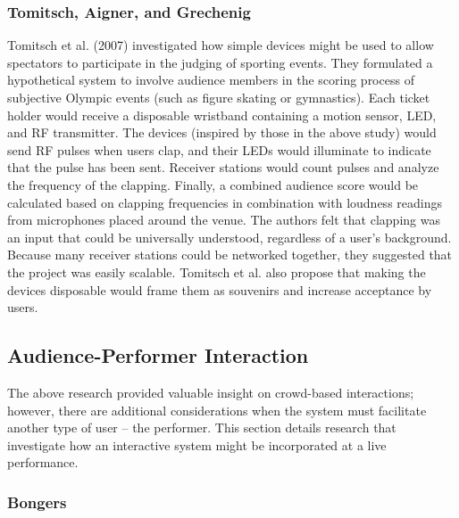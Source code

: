 \subsubsection{Tomitsch, Aigner, and Grechenig}

Tomitsch et al. (2007) investigated how simple devices might be used to allow spectators to participate in the judging of sporting events. They formulated a hypothetical system to involve audience members in the scoring process of subjective Olympic events (such as figure skating or gymnastics). Each ticket holder would receive a disposable wristband containing a motion sensor, LED, and RF transmitter. The devices (inspired by those in the above study) would send RF pulses when users clap, and their LEDs would illuminate to indicate that the pulse has been sent. Receiver stations would count pulses and analyze the frequency of the clapping. Finally, a combined audience score would be calculated based on clapping frequencies in combination with loudness readings from microphones placed around the venue. The authors felt that clapping was an input that could be universally understood, regardless of a user's background. Because many receiver stations could be networked together, they suggested that the project was easily scalable. Tomitsch et al. also propose that making the devices disposable would frame them as souvenirs and increase acceptance by users.

\subsection{Audience-Performer Interaction}

The above research provided valuable insight on crowd-based interactions; however, there are additional considerations when the system must facilitate another type of user -- the performer. This section details research that investigate how an interactive system might be incorporated at a live performance.

\subsubsection{Bongers}

